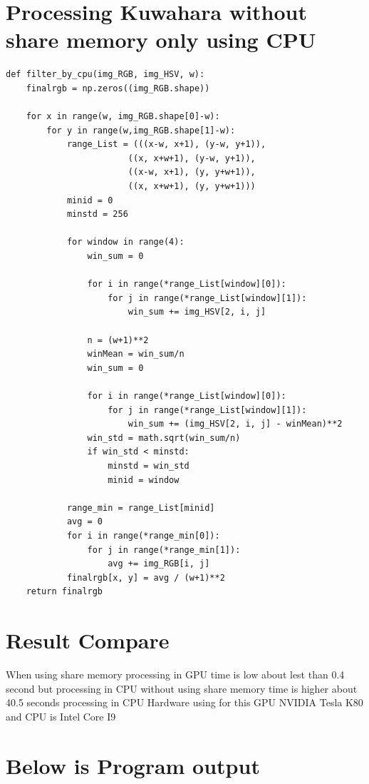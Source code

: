 \documentclass{article}
\begin{document}
\section{Processing Kuwahara without share memory only using CPU}
\begin{verbatim}
def filter_by_cpu(img_RGB, img_HSV, w):
    finalrgb = np.zeros((img_RGB.shape))

    for x in range(w, img_RGB.shape[0]-w):
        for y in range(w,img_RGB.shape[1]-w):
            range_List = (((x-w, x+1), (y-w, y+1)),
                        ((x, x+w+1), (y-w, y+1)),
                        ((x-w, x+1), (y, y+w+1)),
                        ((x, x+w+1), (y, y+w+1)))
            minid = 0
            minstd = 256

            for window in range(4):
                win_sum = 0

                for i in range(*range_List[window][0]):
                    for j in range(*range_List[window][1]):
                        win_sum += img_HSV[2, i, j]

                n = (w+1)**2
                winMean = win_sum/n
                win_sum = 0

                for i in range(*range_List[window][0]):
                    for j in range(*range_List[window][1]):
                        win_sum += (img_HSV[2, i, j] - winMean)**2
                win_std = math.sqrt(win_sum/n)
                if win_std < minstd:
                    minstd = win_std
                    minid = window

            range_min = range_List[minid]
            avg = 0
            for i in range(*range_min[0]):
                for j in range(*range_min[1]):
                    avg += img_RGB[i, j]
            finalrgb[x, y] = avg / (w+1)**2
    return finalrgb
\end{verbatim}

\section{Result Compare }
When using share memory processing in GPU time is low about lest than 0.4 second but processing in CPU without using share memory 
time is higher about 40.5 seconds processing in CPU 
Hardware using for this GPU NVIDIA Tesla K80 and CPU is Intel Core I9 

\section{Below is Program output}
\end{document}
